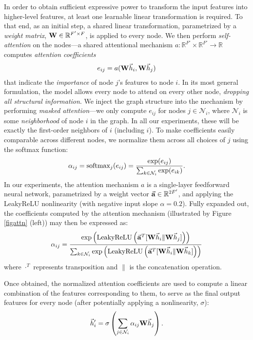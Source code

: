 \documentclass{article} %
\begin{document}
In order to obtain sufficient expressive power to transform the input features into higher-level features, at least one learnable linear transformation is required. To that end, as an initial step, a shared linear transformation, parametrized by a \emph{weight matrix}, ${\bf W} \in \mathbb{R}^{F' \times F}$, is applied to every node. We then perform \emph{self-attention} on the nodes---a shared attentional mechanism $a : \mathbb{R}^{F'} \times \mathbb{R}^{F'} \rightarrow \mathbb{R}$ computes \emph{attention coefficients} 
\begin{equation} 
e_{ij} = a({\bf W}\vec{h}_i, {\bf W}\vec{h}_j)
\vspace{0.15cm}
\end{equation}
that indicate the \emph{importance} of node $j$'s features to node $i$. In its most general formulation, the model allows every node to attend on every other node, \emph{dropping all structural information}. We inject the graph structure into the mechanism by performing \emph{masked attention}---we only compute $e_{ij}$ for nodes $j\in\mathcal{N}_i$, where $\mathcal{N}_i$ is some \emph{neighborhood} of node $i$ in the graph. In all our experiments, these will be exactly the first-order neighbors of $i$ (including $i$). To make coefficients easily comparable across different nodes, we normalize them across all choices of $j$ using the softmax function:
\begin{equation}
\vspace{0.1cm}
\alpha_{ij} = \mathrm{softmax}_j(e_{ij})=\frac{\exp(e_{ij})}{\sum_{k\in\mathcal{N}_i} \exp(e_{ik})}.
\end{equation}
In our experiments, the attention mechanism $a$ is a single-layer feedforward neural network, parametrized by a weight vector $\vec{\bf a} \in \mathbb{R}^{2F'}$, and applying the LeakyReLU nonlinearity (with negative input slope $\alpha=0.2$). Fully expanded out, the coefficients computed by the attention mechanism (illustrated by Figure \ref{figattn} (left)) may then be expressed as:
\begin{equation}
	\alpha_{ij} = \frac{\exp\left(\text{LeakyReLU}\left(\vec{\bf a}^T[{\bf W}\vec{h}_i\|{\bf W}\vec{h}_j]\right)\right)}{\sum_{k\in\mathcal{N}_i} \exp\left(\text{LeakyReLU}\left(\vec{\bf a}^T[{\bf W}\vec{h}_i\|{\bf W}\vec{h}_k]\right)\right)}
\end{equation}
where $\cdot^T$ represents transposition and $\|$ is the concatenation operation.

Once obtained, the normalized attention coefficients are used to compute a linear combination of the features corresponding to them, to serve as the final output features for every node (after potentially applying a nonlinearity, $\sigma$):
\begin{equation}\label{eqnatt}
	\vec{h}'_i = \sigma\left(\sum_{j\in\mathcal{N}_i} \alpha_{ij} {\bf W}\vec{h}_j\right).
\end{equation}
\end{document}
